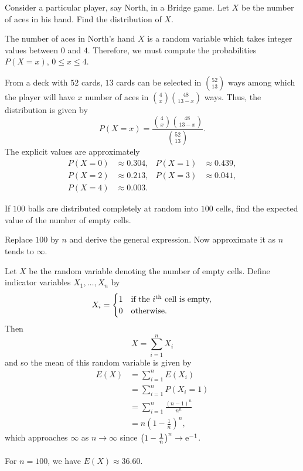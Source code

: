 \begin{problem}[Handout 1, \# 16]
  Consider a particular player, say North, in a Bridge game. Let \(X\) be
  the number of aces in his hand. Find the distribution of \(X\).
\end{problem}
\begin{solution*}
  The number of aces in North's hand \(X\) is a random variable which takes
  integer values between \(0\) and \(4\). Therefore, we must compute the
  probabilities \(P(X=x)\), \(0\leq x\leq 4\).

  From a deck with \(52\) cards, \(13\) cards can be selected in
  \(\binom{52}{13}\) ways among which the player will have \(x\) number of
  aces in \(\binom{4}{x}\binom{48}{13-x}\) ways. Thus, the distribution is
  given by
  \[
    P(X=x)=\frac{\binom{4}{x}\binom{48}{13-x}}{\binom{52}{13}}.
  \]
  The explicit values are approximately
  \begin{align*}
    P(X=0)&\approx 0.304,
    &P(X=1)&\approx 0.439,\\
    P(X=2)&\approx 0.213,
    &P(X=3)&\approx 0.041,\\
    P(X=4)&\approx 0.003.
  \end{align*}
\end{solution*}

\begin{problem}[Handout 1, \# 20]
  If \(100\) balls are distributed completely at random into \(100\) cells,
  find the expected value of the number of empty cells.

  \noindent Replace \(100\) by \(n\) and derive the general expression. Now
  approximate it as \(n\) tends to \(\infty\).
\end{problem}
\begin{solution*}
  Let \(X\) be the random variable denoting the number of empty
  cells. Define indicator variables \(X_1,\dotsc,X_n\) by
  \[
    X_i=
    \begin{cases}
      1&\text{if the \(i\)\textsuperscript{th} cell is empty,}\\
      0&\text{otherwise.}
    \end{cases}
  \]
  Then
  \[
    X=\sum_{i=1}^n X_i
  \]
  and so the mean of this random variable is given by
  \begin{align*}
    E(X)
    &=\sum_{i=1}^n E(X_i)\\
    &=\sum_{i=1}^n P(X_i=1)\\
    &=\sum_{i=1}^n\frac{(n-1)^n}{n^n}\\
    &=n\left(1-\frac{1}{n}\right)^n,
  \end{align*}
  which approaches \(\infty\) as \(n\to\infty\) since
  \(\bigl(1-\frac{1}{n}\bigr)^n\to \mathrm{e}^{-1}\).
  \\\\
  For \(n=100\), we have \(E(X)\approx 36.60\).
\end{solution*}

